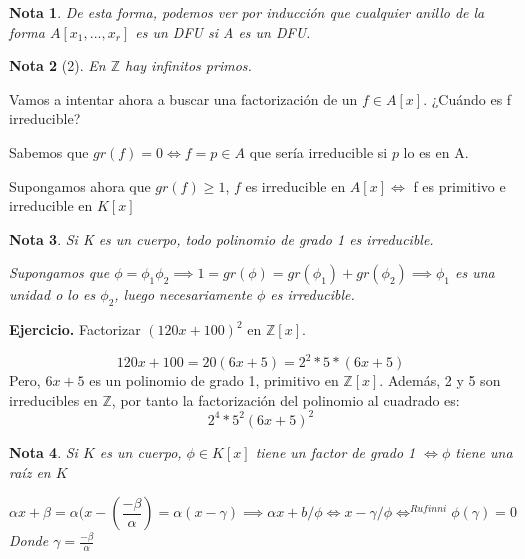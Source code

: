 \documentclass[11pt, a4paper, titlepage]{article}
\makeatletter
\newif\IfInSansMode
\let\oldsf\sffamily
\renewcommand*{\sffamily}{\oldsf\mathversion{sans}\InSansModetrue}
\let\oldnorm\normalfont
\renewcommand*{\normalfont}{\oldnorm\InSansModefalse\mathversion{normal}}
\renewenvironment{proof}[1][\proofname] {\vspace{-15pt}\par\pushQED{\qed}\normalfont\topsep6\p@\@plus6\p@\relax\trivlist\item[\hskip\labelsep\it#1\@addpunct{.}]\ignorespaces}{\popQED\endtrivlist\@endpefalse}
\providecommand{\ent}{\mathbb{Z}}
\renewenvironment{proof}[1][\proofname] {\par\pushQED{\qed}\normalfont\topsep6\p@\@plus6\p@\relax\trivlist\item[\hskip\labelsep\itshape\sffamily#1\@addpunct{.}]\ignorespaces}{\popQED\endtrivlist\@endpefalse}
\theoremstyle{theorem-style}
\theoremstyle{definition-style}
\theoremstyle{remark-style}
\newtheorem*{nota}{Nota}
\theoremstyle{example-style}
\makeatother
\begin{document}
\begin{nota}
	De esta forma, podemos ver por inducción que cualquier anillo de la forma $A[x_1,...,x_r] $ es un DFU si A es un DFU.
\end{nota}
\begin{nota}[2]
	En $\ent$ hay infinitos primos.

\end{nota}

Vamos a intentar ahora a buscar una factorización de un $f \in A[x]$. ¿Cuándo es f irreducible?

 Sabemos que $gr(f) = 0 \iff f = p \in A$ que sería irreducible si $p$ lo es en A.

 Supongamos ahora que $gr(f) \geq 1$, $f$ es irreducible en $A[x] \iff$ f es primitivo e irreducible en $K[x]$

\begin{nota}
	Si K es un cuerpo, todo polinomio de grado 1 es irreducible.
	\begin{proof}
	Supongamos que $\phi = \phi_1 \phi_2 \implies 1 = gr(\phi) =  gr(\phi_1)+gr(\phi_2) \implies \phi_1$ es una unidad o lo es $\phi_2$, luego necesariamente $\phi$ es irreducible.
\end{proof}
\end{nota}


\textbf{Ejercicio.} Factorizar $(120x+100)^2$ en $\ent[x]$.

\[
120x+100 = 20(6x+5) = 2^2*5*(6x+5)
\]
Pero, $6x+5$ es un polinomio de grado 1, primitivo en $\ent[x]$. Además, 2 y 5 son irreducibles en $\ent$, por tanto la factorización del polinomio al cuadrado es:
\[
2^4*5^2(6x+5)^2
\]

\begin{nota}
	Si $K$ es un cuerpo, $\phi \in K[x]$ tiene un factor de grado 1 $\iff \phi$ tiene una raíz en $K$
	\begin{proof}
	$$\alpha x + \beta = \alpha(x-(\frac{-\beta}{\alpha}) = \alpha(x - \gamma) \implies \alpha x+b/\phi \iff x-\gamma / \phi \iff^{Rufinni} \phi(\gamma) = 0$$
	Donde $\gamma = \frac{-\beta}{\alpha}$
\end{proof}
\end{nota}
\end{document}

